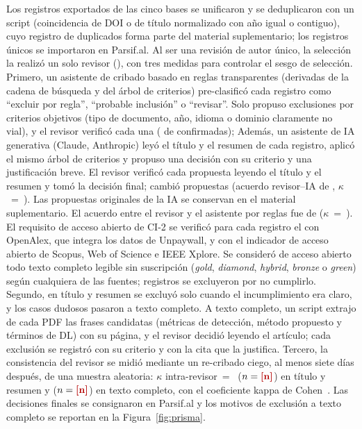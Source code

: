 \documentclass[12pt, a4paper]{article}
\begin{document}
Los registros exportados de las cinco bases se unificaron y se deduplicaron con un script (coincidencia de DOI o de t\'{i}tulo normalizado con a\~{n}o igual o contiguo), cuyo registro de duplicados forma parte del material suplementario; los registros \'{u}nicos se importaron en Parsif.al. Al ser una revisi\'{o}n de autor \'{u}nico, la selecci\'{o}n la realiz\'{o} un solo revisor (\Revisor), con tres medidas para controlar el sesgo de selecci\'{o}n. Primero, un asistente de cribado basado en reglas transparentes (derivadas de la cadena de b\'{u}squeda y del \'{a}rbol de criterios) pre-clasific\'{o} cada registro como ``excluir por regla'', ``probable inclusi\'{o}n'' o ``revisar''. Solo propuso exclusiones por criterios objetivos (tipo de documento, a\~{n}o, idioma o dominio claramente no vial), y el revisor verific\'{o} cada una (\NExclReglaConfirmadas{} de \NExclRegla{} confirmadas); Adem\'{a}s, un asistente de IA generativa (Claude, Anthropic) ley\'{o} el t\'{i}tulo y el resumen de cada registro, aplic\'{o} el mismo \'{a}rbol de criterios y propuso una decisi\'{o}n con su criterio y una justificaci\'{o}n breve. El revisor verific\'{o} cada propuesta leyendo el t\'{i}tulo y el resumen y tom\'{o} la decisi\'{o}n final; cambi\'{o} \NCambiosIATA{} propuestas (acuerdo revisor--IA de \AcuerdoIATA{}, $\kappa$~=~\KappaIATA). Las propuestas originales de la IA se conservan en el material suplementario. El acuerdo entre el revisor y el asistente por reglas fue de \AcuerdoAsistenteTA{} ($\kappa$~=~\KappaAsistenteTA). El requisito de acceso abierto de CI-2 se verific\'{o} para cada registro el \FechaOA{} con OpenAlex, que integra los datos de Unpaywall, y con el indicador de acceso abierto de Scopus, Web of Science e IEEE Xplore. Se consider\'{o} de acceso abierto todo texto completo legible sin suscripci\'{o}n (\textit{gold}, \textit{diamond}, \textit{hybrid}, \textit{bronze} o \textit{green}) seg\'{u}n cualquiera de las fuentes; \NexclOA{} registros se excluyeron por no cumplirlo. Segundo, en t\'{i}tulo y resumen se excluy\'{o} solo cuando el incumplimiento era claro, y los casos dudosos pasaron a texto completo. A texto completo, un script extrajo de cada PDF las frases candidatas (m\'{e}tricas de detecci\'{o}n, m\'{e}todo propuesto y t\'{e}rminos de DL) con su p\'{a}gina, y el revisor decidi\'{o} leyendo el art\'{i}culo; cada exclusi\'{o}n se registr\'{o} con su criterio y con la cita que la justifica. Tercero, la consistencia del revisor se midi\'{o} mediante un re-cribado ciego, al menos siete d\'{i}as despu\'{e}s, de una muestra aleatoria: $\kappa$ intra-revisor~=~\KappaRecribadoTA{} ($n=\NRecribadoTA$) en t\'{i}tulo y resumen y \KappaRecribadoTC{} ($n=\NRecribadoTC$) en texto completo, con el coeficiente kappa de Cohen~\cite{cohen1960coefficient}. Las decisiones finales se consignaron en Parsif.al y los motivos de exclusi\'{o}n a texto completo se reportan en la Figura~\ref{fig:prisma}.
\end{document}
